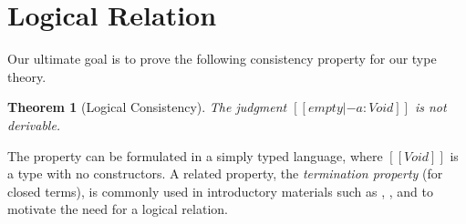 \documentclass[\ifpublic nolinenum\else\fi,online,OA]{jfp}
\newcommand{\scw}[1]{}
\newcommand{\lang}{$\lambda^{\Pi}$\xspace}
\newtheorem{theorem}{Theorem}[section]
\theoremstyle{definition}
\begin{document}

\section{Logical Relation}
\label{sec:logreldep}

\scw{We need to explicitly point out that the key ideas of this paper are
  discussed, here, in this section.
  We need to explicitly remark on why logical relations are difficult to
  define for dependent type theory and explain why this setting is more
  difficult than with simple types (STLC) or with polymorphic types (System F).
  \begin{itemize}
  \item Large eliminations
  \item Definitional equality (not all types look like types)
  \end{itemize}
  Should we be more explicit in our comparison with Girard's trick for polymorphic type?
  There, the definition stays recursive because it doesn't substitute for the variables
  in the function types. But that approach is not available in this setting, because not
  all quantified things are types. And we might need that information to interpret, say,
  equality types in the right way.
}
\scw{ We also need to explicitly point out that our logical relation is untyped.
  This has two benefits: it allows semantic typing to be meaningful independent from
  syntactic typing (cite Derek, forward reference to next section) and it avoids
  significant bookkeeping, especially in the case of Kripke logical relations (we need to define
  what these are).
  Is there a cost to an untyped relation?
}

Our ultimate goal is to prove the following consistency property for our type theory.

\begin{theorem}[Logical Consistency]
  \label{theorem:consistency}
  The judgment $[[empty |- a : Void ]]$ is not derivable.
\end{theorem}
The property can be formulated in a simply typed language, where
$[[Void]]$ is a type with no constructors. A related
property, the \emph{termination property} (for closed terms),
is commonly used in introductory materials such as
\citet{skorstengaard2019introduction}, \citet{pierce2002types}, and
\citet{harpertait} to motivate the need for a logical relation.
\end{document}
